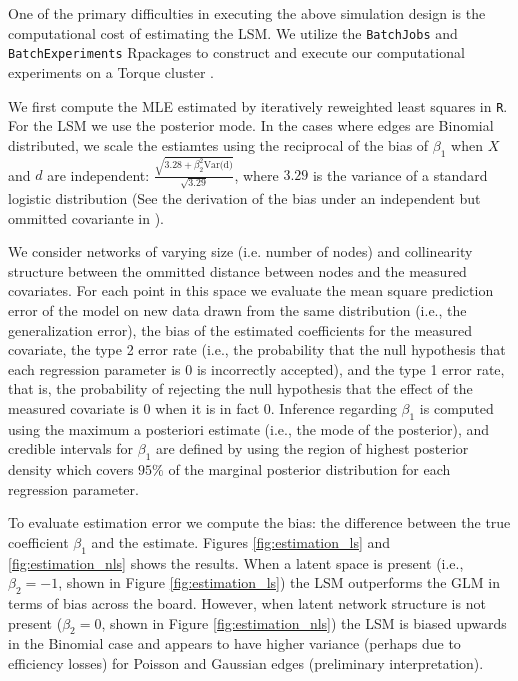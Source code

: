 \documentclass[12pt]{article}
\newcommand{\R}{\textsf{R}\space} %
\begin{document}
One of the primary difficulties in executing the above simulation design is the computational cost of estimating the LSM. We utilize the \texttt{BatchJobs} and \texttt{BatchExperiments} \R packages to construct and execute our computational experiments on a Torque cluster \cite{bischl2015batchjobs}.

We first compute the MLE estimated by iteratively reweighted least squares in \texttt{R}. For the LSM we use the posterior mode. In the cases where edges are Binomial distributed, we scale the estiamtes using the reciprocal of the bias of $\beta_1$ when $X$ and $d$ are independent: $\frac{\sqrt{3.28 + \beta_2^2 \text{Var(d)}}}{\sqrt{3.29}}$, where $3.29$ is the variance of a standard logistic distribution (See the derivation of the bias under an independent but ommitted covariante in \cite{mood2010logistic}).

We consider networks of varying size (i.e. number of nodes) and collinearity structure between the ommitted distance between nodes and the measured covariates. For each point in this space we evaluate the mean square prediction error of the model on new data drawn from the same distribution (i.e., the generalization error), the bias of the estimated coefficients for the measured covariate, the type 2 error rate (i.e., the probability that the null hypothesis that each regression parameter is $0$ is incorrectly accepted), and the type 1 error rate, that is, the probability of rejecting the null hypothesis that the effect of the measured covariate is 0 when it is in fact 0. Inference regarding $\beta_1$ is computed using the maximum a posteriori estimate (i.e., the mode of the posterior), and credible intervals for $\beta_1$ are defined by using the region of highest posterior density which covers $95\%$ of the marginal posterior distribution for each regression parameter.

To evaluate estimation error we compute the bias: the difference between the true coefficient $\beta_1$ and the estimate. Figures \ref{fig:estimation_ls} and \ref{fig:estimation_nls} shows the results. When a latent space is present (i.e., $\beta_2 = -1$, shown in Figure \ref{fig:estimation_ls}) the LSM outperforms the GLM in terms of bias across the board. However, when latent network structure is not present ($\beta_2 = 0$, shown in Figure \ref{fig:estimation_nls}) the LSM is biased upwards in the Binomial case and appears to have higher variance (perhaps due to efficiency losses) for Poisson and Gaussian edges (preliminary interpretation).
\end{document}
